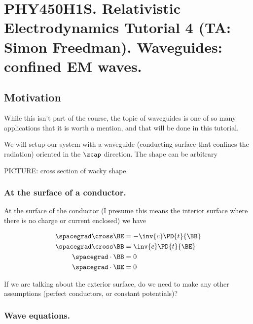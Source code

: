 
%

\chapter{PHY450H1S.  Relativistic Electrodynamics Tutorial 4 (TA: Simon Freedman).  Waveguides: confined EM waves.}
\label{chap:relativisticElectrodynamicsT4}
{}
\date{Mar 3, 2011}

\beginArtWithToc

\section{Motivation}

While this isn't part of the course, the topic of waveguides is one of so many applications that it is worth a mention, and that will be done in this tutorial.

We will setup our system with a waveguide (conducting surface that confines the radiation) oriented in the $\zcap$ direction.  The shape can be arbitrary

PICTURE: cross section of wacky shape.

\subsection{At the surface of a conductor.}

At the surface of the conductor (I presume this means the interior surface where there is no charge or current enclosed) we have

\begin{align}\label{eqn:relativisticElectrodynamicsT4:10}
\spacegrad \cross \BE &= - \inv{c} \PD{t}{\BB} \\
\spacegrad \cross \BB &= \inv{c} \PD{t}{\BE} \\
\spacegrad \cdot \BB &= 0 \\
\spacegrad \cdot \BE &= 0
\end{align}

If we are talking about the exterior surface, do we need to make any other assumptions (perfect conductors, or constant potentials)?

\subsection{Wave equations.}

